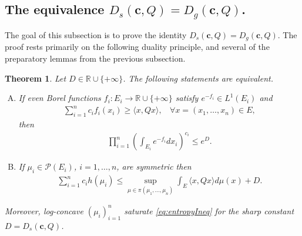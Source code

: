 \documentclass[10pt]{article}
\newtheorem{theorem}{Theorem}
\begin{document}
\subsection{The equivalence $D_s(\mathbf{c},Q) = D_g(\mathbf{c},Q)$.}

The goal of this subsection is to prove the identity $D_s(\mathbf{c},Q) = D_g(\mathbf{c},Q)$.  The proof rests primarily on the following duality principle, and several of the preparatory lemmas from the previous subsection.  
\begin{theorem}\label{thm:EntropicDuality}
Let $D \in \mathbb{R}\cup \{+\infty\}$. The following statements are equivalent.  
\begin{enumerate}[(A)]
\item If  even Borel functions $f_i: E_i \to \mathbb{R} \cup\{+\infty\}$   satisfy $e^{-f_i}\in L^1(E_i)$ and 
\begin{align}
\sum_{i=1}^n c_i f_i(x_i) \geq  \langle x, Q x\rangle, ~~~~ \forall x=(x_1, \dots, x_n) \in E, \label{eq:pointwiseInequality}
\end{align}
then 
\begin{align}
 \prod_{i=1}^n \left( \int_{E_i}e^{-f_i} d x_i\right)^{c_i} \leq e^{D}.  \label{IntegralIneq}
\end{align}
\item If $\mu_i \in \mathcal{P}(E_i)$, $i=1, \dots, n$, are symmetric then 
\begin{align}
  \sum_{i=1}^n c_i h(\mu_i) \leq \sup_{\mu \in \pi(\mu_1, \dots, \mu_n)}  \int_E \langle x, Q x\rangle d\mu(x) + D. \label{eq:entropyIneq}
\end{align}
\end{enumerate}
Moreover, log-concave $(\mu_i)_{i=1}^n$ saturate  \eqref{eq:entropyIneq} for the sharp constant $D= D_s(\mathbf{c},Q)$.
\end{theorem}
\end{document}
